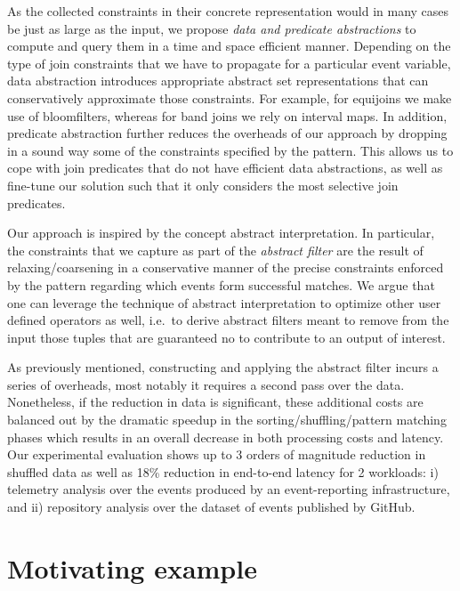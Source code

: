 As the collected constraints in their concrete representation would in many 
cases be just as large as the input, we propose {\em data and predicate 
abstractions} to compute and query them in a time and space efficient manner. 
Depending on the type of join constraints that we have to propagate for a 
particular event variable, data abstraction introduces appropriate abstract set 
representations that can conservatively approximate those constraints. 
For example, for equijoins we make use of bloomfilters, whereas for band joins 
we rely on interval maps.
In addition, predicate abstraction further reduces the overheads of 
our approach by dropping in a sound way some of the constraints specified by 
the pattern. 
This allows us to cope with join predicates that do not have efficient data 
abstractions, as well as fine-tune our solution such that it only considers the 
most selective join predicates.
      
 
Our approach is inspired by the concept abstract interpretation.
In particular, the constraints that we capture as part of the {\em abstract 
filter} are the result of relaxing/coarsening in a conservative manner of the 
precise constraints enforced by the pattern regarding which events form 
successful matches. 
We argue that one can leverage the technique of abstract interpretation to 
optimize other user defined operators as well, i.e.\ to derive abstract filters 
meant to remove from the input those tuples that are guaranteed no to 
contribute to an output of interest.


As previously mentioned, constructing and applying the abstract filter incurs a 
series of overheads, most notably it requires a second pass over the data.
Nonetheless, if the reduction in data is significant, these additional costs 
are balanced out by the dramatic speedup in the sorting/shuffling/pattern 
matching phases which results in an overall decrease in both processing costs 
and latency.  
Our experimental evaluation shows up to 3 orders of magnitude reduction in 
shuffled data as well as 18\% reduction in end-to-end latency for 2 workloads:
i) telemetry analysis over the events produced by an event-reporting 
infrastructure, and
ii) repository analysis over the dataset of events published by GitHub.









\section{Motivating example}

